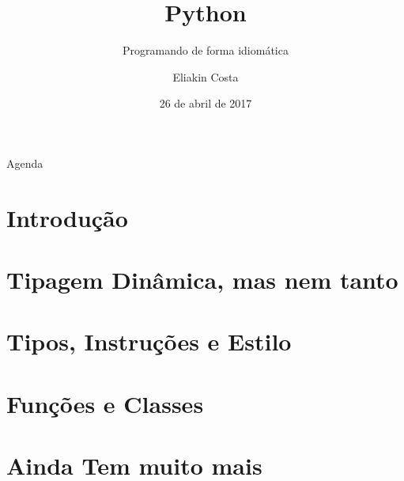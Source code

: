\documentclass{beamer}
\title{Python}
\subtitle{Programando de forma idiomática}
\author{Eliakin Costa}
\date{26 de abril de 2017}
\institute{Instituto Federal da Bahia\\
campus Salvador\\
\url{eliakincosta@ifba.edu.br}
}
\begin{document}
\begin{frame}[t]
	\maketitle
\end{frame}

\begin{frame}[t]{Agenda}
\tableofcontents
\end{frame}

\def\sectionname{}
\def\insertsectionnumber{}
\def\subsectionname{}
\def\insertsubsectionnumber{}

\AtBeginSection{\frame{\sectionpage}\addtocounter{framenumber}{-1}}


\AtBeginSubsection{\frame{\subsectionpage}\addtocounter{framenumber}{-1} }
\AtBeginSubsubsection{\frame{\subsubsectionpage}\addtocounter{framenumber}{-1} }






\section{Introdução}


\section{Tipagem Dinâmica, mas nem tanto}


\section{Tipos, Instruções e Estilo}


\section{Funções e Classes}


\section{Ainda Tem muito mais}



\end{document}
